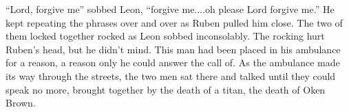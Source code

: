 ``Lord, forgive me'' sobbed Leon, ``forgive me....oh please Lord forgive me.''  He kept repeating the phrases over and over as Ruben pulled him close.  The two of them locked together rocked as Leon sobbed inconsolably.  The rocking hurt Ruben's head, but he didn't mind.  This man had been placed in his ambulance for a reason, a reason only he could answer the call of.  As the ambulance made its way through the streets, the two men sat there and talked until they could speak no more, brought together by the death of a titan, the death of Oken Brown.

